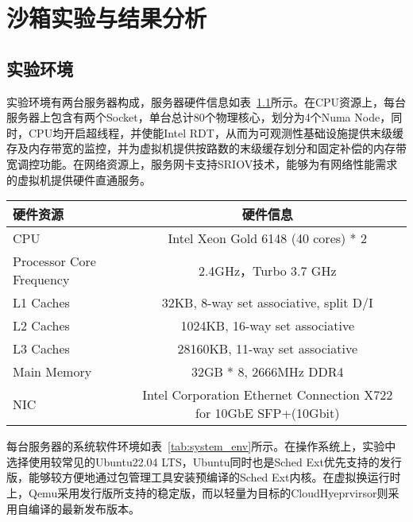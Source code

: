 \chapter{沙箱实验与结果分析}\label{chap:exp}

% 
\section{实验环境}

实验环境有两台服务器构成，服务器硬件信息如表~\ref{tab:exp_env}所示。在CPU资源上，每台服务器上包含有两个Socket，单台总计80个物理核心，划分为4个Numa Node，同时，CPU均开启超线程，并使能Intel RDT，从而为可观测性基础设施提供末级缓存及内存带宽的监控，并为虚拟机提供按路数的末级缓存划分和固定补偿的内存带宽调控功能。在网络资源上，服务网卡支持SRIOV技术，能够为有网络性能需求的虚拟机提供硬件直通服务。

\begin{table}
    \label{tab:exp_env}
    \footnotesize%
    \setlength{\tabcolsep}{4pt}%
    \renewcommand{\arraystretch}{1.5}%
    \centering
    \begin{tabular}{lc}
        \hline
        硬件资源 & 硬件信息 \\
        \hline
        CPU & Intel Xeon Gold 6148 (40 cores) * 2 \\
        Processor Core Frequency & 2.4GHz，Turbo 3.7 GHz \\
        L1 Caches & 32KB,  8-way set associative, split D/I \\
        L2 Caches & 1024KB, 16-way set associative \\
        L3 Caches & 28160KB, 11-way set associative \\
        Main Memory & 32GB * 8, 2666MHz DDR4 \\
        NIC & Intel Corporation Ethernet Connection X722 for 10GbE SFP+(10Gbit) \\
        \hline
    \end{tabular}
\end{table}

每台服务器的系统软件环境如表~\ref{tab:system_env}所示。在操作系统上，实验中选择使用较常见的Ubuntu22.04 LTS，Ubuntu同时也是Sched Ext优先支持的发行版，能够较方便地通过包管理工具安装预编译的Sched Ext内核。在虚拟换运行时上，Qemu采用发行版所支持的稳定版，而以轻量为目标的CloudHyeprvirsor则采用自编译的最新发布版本。

